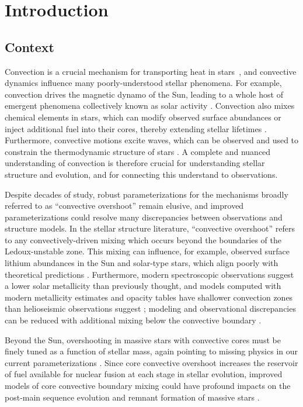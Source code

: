 \documentclass[twocolumn, linenumbers]{aastex631}
\begin{document}
\section{Introduction}
\label{sec:introduction}

\subsection{Context}
Convection is a crucial mechanism for transporting heat in stars~\citep{woosley_etal_2002, hansen_etal_2004, christensen-dalsgaard_2021}, and convective dynamics influence many poorly-understood stellar phenomena.
For example, convection drives the magnetic dynamo of the Sun, leading to a whole host of emergent phenomena collectively known as solar activity \citep{brun_browning_2017}.
Convection also mixes chemical elements in stars, which can modify observed surface abundances or inject additional fuel into their cores, thereby extending stellar lifetimes \citep{salaris_cassisi_2017}.
Furthermore, convective motions excite waves, which can be observed and used to constrain the thermodynamic structure of stars \citep{aerts2010, basu2016}.
A complete and nuanced understanding of convection is therefore crucial for understanding stellar structure and evolution, and for connecting this understand to observations.

Despite decades of study, robust parameterizations for the mechanisms broadly referred to as ``convective overshoot'' remain elusive, and improved parameterizations could resolve many discrepancies between observations and structure models.
In the stellar structure literature, ``convective overshoot'' refers to any convectively-driven mixing which occurs beyond the boundaries of the Ledoux-unstable zone.
This mixing can influence, for example, observed surface lithium abundances in the Sun and solar-type stars, which align poorly with theoretical predictions \citep{pinsonneault1997, carlos_etal_2019, dumont_etal_2021}.
Furthermore, modern spectroscopic observations suggest a lower solar metallicity than previously thought, and models computed with modern metallicity estimates and opacity tables have shallower convection zones than helioseismic observations suggest \citep{basu_antia_2004, bahcall_etal_2005, bergemann_serenelli_2014, vinyoles_etal_2017, asplund_etal_2021}; modeling and observational discrepancies can be reduced with additional mixing below the convective boundary \citep{christensen-dalsgaard_etal_2011}.

Beyond the Sun, overshooting in massive stars with convective cores must be finely tuned as a function of stellar mass, again pointing to missing physics in our current parameterizations \citep{claret_torres_2018, jermyn_etal_2018, viani_basu_2020, martinet_etal_2021, pedersen_etal_2021}.
Since core convective overshoot increases the reservoir of fuel available for nuclear fusion at each stage in stellar evolution, improved models of core convective boundary mixing could have profound impacts on the post-main sequence evolution and remnant formation of massive stars \citep{farmer_etal_2019, higgins_vink_2020}.
\end{document}
